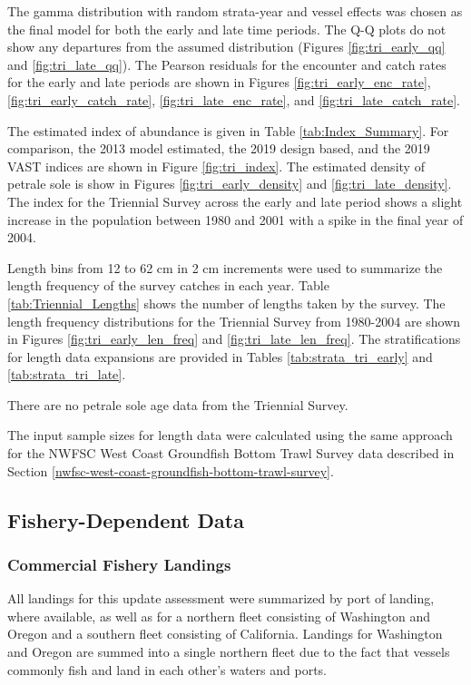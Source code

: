 \documentclass[12pt,]{article}
\begin{document}
The gamma distribution with random strata-year and vessel effects was
chosen as the final model for both the early and late time periods. The
Q-Q plots do not show any departures from the assumed distribution
(Figures \ref{fig:tri_early_qq} and \ref{fig:tri_late_qq}). The Pearson
residuals for the encounter and catch rates for the early and late
periods are shown in Figures \ref{fig:tri_early_enc_rate},
\ref{fig:tri_early_catch_rate}, \ref{fig:tri_late_enc_rate}, and
\ref{fig:tri_late_catch_rate}.

The estimated index of abundance is given in Table
\ref{tab:Index_Summary}. For comparison, the 2013 model estimated, the
2019 design based, and the 2019 VAST indices are shown in Figure
\ref{fig:tri_index}. The estimated density of petrale sole is show in
Figures \ref{fig:tri_early_density} and \ref{fig:tri_late_density}. The
index for the Triennial Survey across the early and late period shows a
slight increase in the population between 1980 and 2001 with a spike in
the final year of 2004.

Length bins from 12 to 62 cm in 2 cm increments were used to summarize
the length frequency of the survey catches in each year. Table
\ref{tab:Triennial_Lengths} shows the number of lengths taken by the
survey. The length frequency distributions for the Triennial Survey from
1980-2004 are shown in Figures \ref{fig:tri_early_len_freq} and
\ref{fig:tri_late_len_freq}. The stratifications for length data
expansions are provided in Tables \ref{tab:strata_tri_early} and
\ref{tab:strata_tri_late}.

There are no petrale sole age data from the Triennial Survey.

The input sample sizes for length data were calculated using the same
approach for the NWFSC West Coast Groundfish Bottom Trawl Survey data
described in Section
\ref{nwfsc-west-coast-groundfish-bottom-trawl-survey}.

\subsection{Fishery-Dependent Data}\label{fishery-dependent-data}

\subsubsection{Commercial Fishery
Landings}\label{commercial-fishery-landings}

All landings for this update assessment were summarized by port of
landing, where available, as well as for a northern fleet consisting of
Washington and Oregon and a southern fleet consisting of California.
Landings for Washington and Oregon are summed into a single northern
fleet due to the fact that vessels commonly fish and land in each
other's waters and ports.
\end{document}
